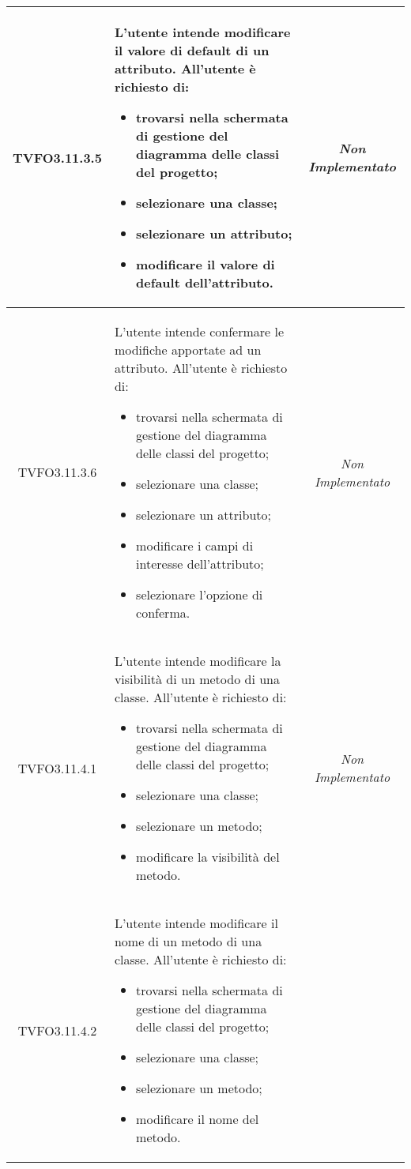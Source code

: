 \begin{longtable}{|c|>{}m{8cm}|c|}
\hypertarget{TVFO3.11.3.5}{TVFO3.11.3.5} & L'utente intende modificare il valore di default di un attributo.
All'utente è richiesto di:
\begin{itemize}
\item trovarsi nella schermata di gestione del diagramma delle classi del progetto;
\item selezionare una classe;
\item selezionare un attributo;
\item modificare il valore di default dell'attributo.
\end{itemize} & \textit{Non Implementato}\\ \hline
\hypertarget{TVFO3.11.3.6}{TVFO3.11.3.6} & L'utente intende confermare le modifiche apportate ad un attributo.
All'utente è richiesto di:
\begin{itemize}
\item trovarsi nella schermata di gestione del diagramma delle classi del progetto;
\item selezionare una classe;
\item selezionare un attributo;
\item modificare i campi di interesse dell'attributo;
\item selezionare l'opzione di conferma.
\end{itemize} & \textit{Non Implementato}\\ \hline
\hypertarget{TVFO3.11.4.1}{TVFO3.11.4.1} & L'utente intende modificare la visibilità di un metodo di una classe.
All'utente è richiesto di:
\begin{itemize}
\item trovarsi nella schermata di gestione del diagramma delle classi del progetto;
\item selezionare una classe;
\item selezionare un metodo;
\item modificare la visibilità del metodo.
\end{itemize} & \textit{Non Implementato}\\ \hline
\hypertarget{TVFO3.11.4.2}{TVFO3.11.4.2} & L'utente intende modificare il nome di un metodo di una classe.
All'utente è richiesto di:
\begin{itemize}
\item trovarsi nella schermata di gestione del diagramma delle classi del progetto;
\item selezionare una classe;
\item selezionare un metodo;
\item modificare il nome del metodo.

\end{itemize}
\end{longtable}
